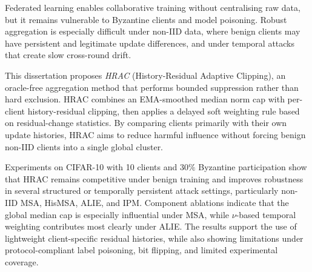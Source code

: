 Federated learning enables collaborative training without centralising raw data,
but it remains vulnerable to Byzantine clients and model poisoning. Robust
aggregation is especially difficult under non-IID data, where benign clients may
have persistent and legitimate update differences, and under temporal attacks
that create slow cross-round drift.

This dissertation proposes \emph{HRAC} (History-Residual Adaptive Clipping), an
oracle-free aggregation method that performs bounded suppression rather than
hard exclusion. HRAC combines an EMA-smoothed median norm cap with per-client
history-residual clipping, then applies a delayed soft weighting rule based on
residual-change statistics. By comparing clients primarily with their own update
histories, HRAC aims to reduce harmful influence without forcing benign
non-IID clients into a single global cluster.

Experiments on CIFAR-10 with 10 clients and $30\%$ Byzantine participation show
that HRAC remains competitive under benign training and improves robustness in
several structured or temporally persistent attack settings, particularly
non-IID MSA, HisMSA, ALIE, and IPM. Component ablations indicate that the global
median cap is especially influential under MSA, while $\nu$-based temporal
weighting contributes most clearly under ALIE. The results support the use of lightweight client-specific
residual histories, while also showing limitations under protocol-compliant
label poisoning, bit flipping, and limited experimental coverage.
